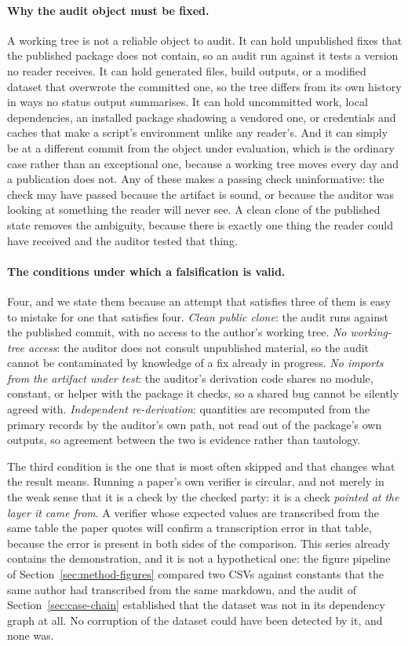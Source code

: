 \documentclass[sigconf,review]{acmart}
\begin{document}
\paragraph{Why the audit object must be fixed.} A working tree is not a
reliable object to audit. It can hold unpublished fixes that the published
package does not contain, so an audit run against it tests a version no reader
receives. It can hold generated files, build outputs, or a modified dataset
that overwrote the committed one, so the tree differs from its own history in
ways no status output summarises. It can hold uncommitted work, local
dependencies, an installed package shadowing a vendored one, or credentials and
caches that make a script's environment unlike any reader's. And it can simply
be at a different commit from the object under evaluation, which is the
ordinary case rather than an exceptional one, because a working tree moves
every day and a publication does not. Any of these makes a passing check
uninformative: the check may have passed because the artifact is sound, or
because the auditor was looking at something the reader will never see. A
clean clone of the published state removes the ambiguity, because there is
exactly one thing the reader could have received and the auditor tested that
thing.

\paragraph{The conditions under which a falsification is valid.} Four, and we
state them because an attempt that satisfies three of them is easy to mistake
for one that satisfies four. \emph{Clean public clone}: the audit runs against
the published commit, with no access to the author's working tree.
\emph{No working-tree access}: the auditor does not consult unpublished
material, so the audit cannot be contaminated by knowledge of a fix already in
progress. \emph{No imports from the artifact under test}: the auditor's
derivation code shares no module, constant, or helper with the package it
checks, so a shared bug cannot be silently agreed with. \emph{Independent
re-derivation}: quantities are recomputed from the primary records by the
auditor's own path, not read out of the package's own outputs, so agreement
between the two is evidence rather than tautology.

The third condition is the one that is most often skipped and that changes what
the result means. Running a paper's own verifier is circular, and not merely
in the weak sense that it is a check by the checked party: it is a check
\emph{pointed at the layer it came from}. A verifier whose expected values are
transcribed from the same table the paper quotes will confirm a transcription
error in that table, because the error is present in both sides of the
comparison. This series already contains the demonstration, and it is not a
hypothetical one: the figure pipeline of Section~\ref{sec:method-figures}
compared two CSVs against constants that the same author had transcribed from
the same markdown, and the audit of Section~\ref{sec:case-chain} established
that the dataset was not in its dependency graph at all. No corruption of the
dataset could have been detected by it, and none was.
\end{document}
